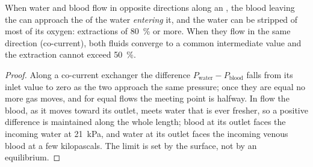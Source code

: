 \begin{theorem}\label{thm:b1:gas-exchange:countercurrent}
When water and blood flow in opposite directions along an , the blood leaving the  can approach the 
of the water \emph{entering} it, and the water can be stripped of most
of its oxygen: extractions of \qty{80}{\%} or more. When they flow in
the same direction (co-current), both fluids converge to a common
intermediate value and the extraction cannot exceed \qty{50}{\%}.
\end{theorem}
\begin{proof}
Along a co-current exchanger the difference $P_{\text{water}} -
P_{\text{blood}}$ falls from its inlet value to zero as the two
approach the same pressure; once they are equal no more gas moves,
and for equal flows the meeting point is halfway. In 
flow the blood, as it moves toward its outlet, meets water that is
ever fresher, so a positive difference is maintained along the whole
length; blood at its outlet faces the incoming water at \qty{21}{kPa},
and water at its outlet faces the incoming venous blood at a few
kilopascals. The limit is set by the surface, not by an equilibrium.
\end{proof}

